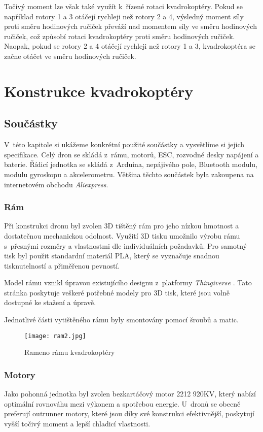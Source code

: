\documentclass[12pt]{report}
\begin{document}
Točivý moment lze však také využít k~řízené rotaci kvadrokoptéry. Pokud se například rotory 1 a 3 otáčejí rychleji než rotory 2 a 4, výsledný moment síly proti směru hodinových ručiček převáží nad momentem síly ve směru hodinových ručiček, což způsobí rotaci kvadrokoptéry proti směru hodinových ručiček. Naopak, pokud se rotory 2 a 4 otáčejí rychleji než rotory 1 a 3, kvadrokoptéra se začne otáčet ve směru hodinových ručiček. \cite{nasa} \cite{ca}
\part{Konstrukce kvadrokoptéry} %

\chapter[Součástky]{Součástky}
V~této kapitole si ukážeme konkrétní použité součástky a vysvětlíme si jejich specifikace. Celý dron se skládá z~rámu, motorů, ESC, rozvodné desky napájení a baterie. Řídicí jednotka se skládá z~Arduina, nepájivého pole, Bluetooth modulu, modulu gyroskopu a akcelerometru. Většina těchto součástek byla zakoupena na internetovém obchodu \textit{Aliexpress}.

\section[Rám]{Rám}
Při konstrukci dronu byl zvolen 3D tištěný rám pro jeho nízkou hmotnost a dostatečnou mechanickou odolnost. Využití 3D tisku umožnilo výrobu rámu s~přesnými rozměry a vlastnostmi dle individuálních požadavků. Pro samotný tisk byl použit standardní materiál PLA, který se vyznačuje snadnou tisknutelností a přiměřenou pevností.

Model rámu vznikl úpravou existujícího designu z~platformy \textit{Thingiverse} \cite{ram}. Tato stránka poskytuje veškeré potřebné modely pro 3D tisk, které jsou volně dostupné ke stažení a úpravě.

Jednotlivé části vytištěného rámu byly smontovány pomocí šroubů a matic.

\begin{figure}[H]
	\centering
	\texttt{[image: ram2.jpg]}
	\caption{Rameno rámu kvadrokoptéry}
	\label{fig:ram2.jpg}
\end{figure}

\section[Motory]{Motory}
Jako pohonná jednotka byl zvolen bezkartáčový motor 2212 920KV, který nabízí optimální rovnováhu mezi výkonem a spotřebou energie. U~dronů se obecně preferují outrunner motory, které jsou díky své konstrukci efektivnější, poskytují vyšší točivý moment a lepší chladicí vlastnosti.
\end{document}
